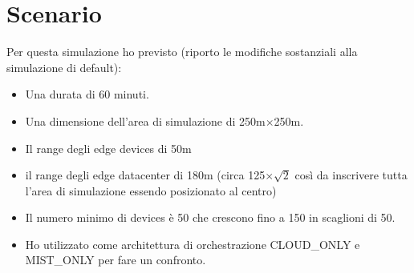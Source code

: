 \documentclass[12pt, a4paper]{report} %
\begin{document}
\section*{Scenario}
Per questa simulazione ho previsto (riporto le modifiche sostanziali alla simulazione di default):
\begin{itemize}
	\item Una durata di 60 minuti.
	\item Una dimensione dell'area di simulazione di 250m$\times$250m.
	\item Il range degli edge devices di 50m
	\item il range degli edge datacenter di 180m (circa 125$\times\sqrt{2}$ così da inscrivere tutta l'area di simulazione essendo posizionato al centro)
	\item Il numero minimo di devices è 50 che crescono fino a 150 in scaglioni di 50.
	\item Ho utilizzato come architettura di orchestrazione CLOUD\_ONLY e MIST\_ONLY per fare un confronto.
	
\end{itemize}
\end{document}

